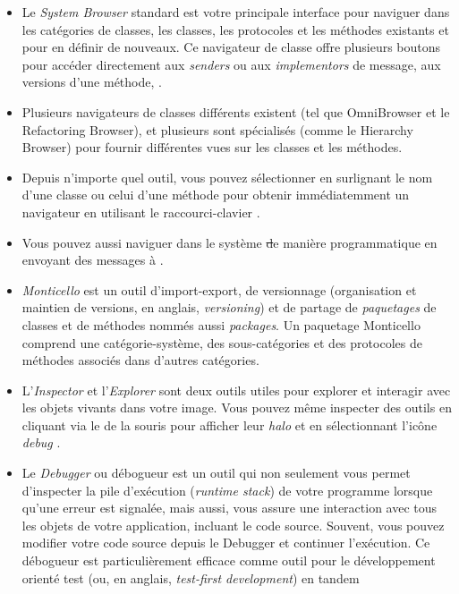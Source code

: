 \documentclass[a4paper,10pt,twoside]{book}
\begin{document}
\begin{itemize}
  \item Le \emph{System Browser} standard est votre principale interface pour naviguer dans les cat\'egories de classes, les classes, les protocoles et les m\'ethodes existants et pour en d\'efinir de nouveaux.
Ce navigateur de classe offre plusieurs boutons pour acc\'eder directement aux \emph{senders} ou aux \emph{implementors} de message, aux versions d'une m\'ethode, 
\etc.
  \item Plusieurs navigateurs de classes diff\'erents existent
(tel que OmniBrowser et le Refactoring Browser), et plusieurs sont sp\'ecialis\'es (comme le Hierarchy Browser) pour fournir diff\'erentes vues sur les classes et les m\'ethodes.
  \item Depuis n'importe quel outil, vous pouvez s\'electionner en surlignant le nom d'une classe ou celui d'une m\'ethode pour obtenir imm\'ediatemment
un navigateur en utilisant le raccourci-clavier .
  \item Vous pouvez aussi naviguer dans le syst\`eme \st de mani\`ere
programmatique en envoyant des messages \`a .
  \item \emph{Monticello} est un outil d'import-export, de versionnage
    (organisation et maintien de versions, en anglais, \emph{versioning}) et de partage de \emph{paquetages} de classes et de m\'ethodes nomm\'es aussi \emph{packages}.
  Un paquetage Monticello comprend une cat\'egorie-syst\`eme, des sous-cat\'egories et des protocoles de m\'ethodes associ\'es dans d'autres cat\'egories. 
  \item L'\emph{Inspector} et l'\emph{Explorer} sont deux outils utiles
pour explorer et interagir avec les objets vivants dans votre image.
Vous pouvez m\^eme inspecter des outils en cliquant via le
 de la souris pour afficher leur \emph{halo}
et en s\'electionnant l'ic\^one
\emph{debug}
\debugHandle .
  \item Le \emph{Debugger} ou d\'ebogueur est un outil qui non seulement vous permet
d'inspecter la pile d'ex\'ecution (\emph{runtime stack}) de votre
programme lorsque qu'une erreur est signal\'ee, mais aussi, 
vous assure une interaction avec tous les objets de votre application,
incluant le code source. Souvent, vous pouvez modifier votre 
code source depuis le Debugger et continuer l'ex\'ecution.
Ce d\'ebogueur est particuli\`erement efficace comme outil pour
le d\'eveloppement orient\'e test (ou, en anglais, \emph{test-first development}) en tandem

\end{itemize}
\end{document}
